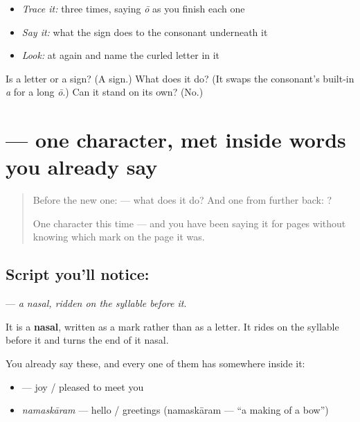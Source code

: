 \begin{quote}
\end{quote}

\begin{itemize}
\raggedright
  \item \emph{Trace it:}  three times, saying \emph{ō} as you finish each one
  \item \emph{Say it:} what the sign does to the consonant underneath it
  \item \emph{Look:} at  again and name the curled letter in it
\end{itemize}

\begin{tcolorbox}[breakable,colback=teal!4,colframe=teal!35!black,title={Before you move on}]
Is  a letter or a sign? (A sign.) What does it do? (It swaps the consonant's built-in \emph{a} for a long \emph{ō}.) Can it stand on its own? (No.)
\end{tcolorbox}
\section[\texorpdfstring{\te{ం} (anusvara)}{ం (anusvara)}]{ — one character, met inside words you already say}

\label{lesson:TE-S04-sign-anusvara}



\begin{quote}
Before the new one:  — what does it do? And one from further back: ?

One character this time — and you have been saying it for pages without knowing which mark on the page it was.
\end{quote}

\subsection*{Script you'll notice: }
\textbf{} — \emph{a nasal, ridden on the syllable before it}.

It is a \textbf{nasal}, written as a mark rather than as a letter. It rides on the syllable before it and turns the end of it nasal.

You already say these, and every one of them has  somewhere inside it:

\begin{itemize}
\raggedright
  \item \textbf{} — joy / pleased to meet you
  \item \textbf{} \emph{namaskāram} — hello / greetings (namaskāram — \textquotedblleft{}a making of a bow\textquotedblright{})
\end{itemize}

